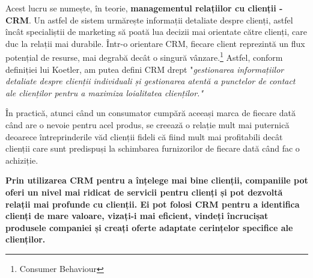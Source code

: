 \documentclass[a4paper, 12pt]{article}
\begin{document}
		\quad Acest lucru se numește, în teorie, \textbf{managementul relațiilor cu clienții - CRM}. Un astfel de sistem  urmărește informații detaliate despre clienți, astfel încât specialiștii de marketing să poată lua decizii mai orientate către clienți, care duc la relații mai durabile. Într-o orientare CRM, fiecare client reprezintă un flux potențial de resurse, mai degrabă decât o singură vânzare.\footnote{Consumer Behaviour} Astfel, conform definiției lui Koetler, am putea defini CRM drept "\textit{gestionarea informațiilor detaliate despre clienții individuali și gestionarea atentă a punctelor de contact ale clienților pentru a maximiza loialitatea clienților."}
		
		\quad În practică, atunci când un consumator cumpără aceeași marca de fiecare dată când are o nevoie pentru acel produs, se creează o relație mult mai puternică deoarece întreprinderile văd clienții fideli că fiind mult mai profitabili decât clienții care sunt predispuși la schimbarea furnizorilor de fiecare dată când fac o achiziție.  
		
		\quad\textbf{ Prin utilizarea CRM pentru a înțelege mai bine clienții, companiile pot oferi un nivel mai ridicat de servicii pentru clienți și pot dezvoltă relații mai profunde cu clienții. Ei pot folosi CRM pentru a identifica
		clienți de mare valoare, vizați-i mai eficient, vindeți încrucișat produsele companiei și creați oferte adaptate cerințelor specifice ale clienților.}
		
\end{document}

